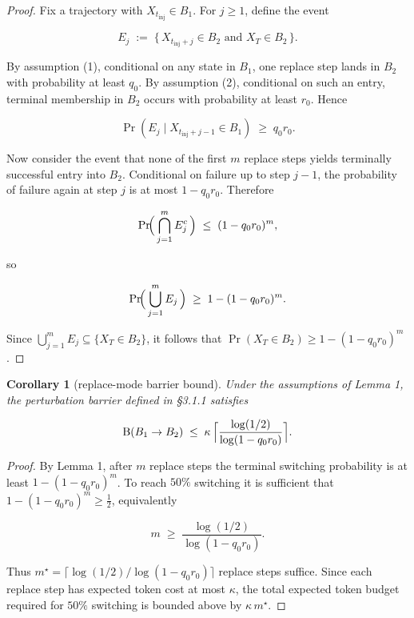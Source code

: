 \documentclass{article}
\theoremstyle{plain}
\newtheorem{corollary}{Corollary}
\theoremstyle{definition}
\begin{document}
\begin{proof}
 Fix a trajectory with $X_{t_{\mathrm{inj}}} \in B_1$. For
$j \ge 1$, define the event

\begin{equation*}
E_j \;:=\; \{\,X_{t_{\mathrm{inj}}+j} \in B_2 \text{ and } X_T \in B_2\,\}.
\end{equation*}

By assumption (1), conditional on any state in $B_1$, one replace
step lands in $B_2$ with probability at least $q_0$. By assumption
(2), conditional on such an entry, terminal membership in $B_2$ occurs
with probability at least $r_0$. Hence

\begin{equation*}
\Pr(E_j \mid X_{t_{\mathrm{inj}}+j-1} \in B_1) \;\ge\; q_0 r_0.
\end{equation*}

Now consider the event that none of the first $m$ replace steps
yields terminally successful entry into $B_2$. Conditional on failure
up to step $j-1$, the probability of failure again at step $j$ is at
most $1 - q_0 r_0$. Therefore

\begin{equation*}
\Pr\!\Bigl(\,\bigcap_{j=1}^{m} E_j^c\,\Bigr) \;\le\; (1 - q_0 r_0)^m,
\end{equation*}

so

\begin{equation*}
\Pr\!\Bigl(\,\bigcup_{j=1}^{m} E_j\,\Bigr) \;\ge\; 1 - (1 - q_0 r_0)^m.
\end{equation*}

Since $\bigcup_{j=1}^{m} E_j \subseteq \{X_T \in B_2\}$, it follows
that $\Pr(X_T \in B_2) \ge 1 - (1 - q_0 r_0)^m$.
\end{proof}


\begin{corollary}[replace-mode barrier bound]
 Under the assumptions
of Lemma 1, the perturbation barrier defined in §3.1.1 satisfies

\begin{equation*}
\mathrm{B}(B_1 \to B_2)
\;\le\;
\kappa \,\Bigl\lceil \frac{\log(1/2)}{\log(1 - q_0 r_0)} \Bigr\rceil .
\end{equation*}
\end{corollary}

\begin{proof}
 By Lemma 1, after $m$ replace steps the terminal switching
probability is at least $1 - (1 - q_0 r_0)^m$. To reach $50\%$
switching it is sufficient that $1 - (1 - q_0 r_0)^m \ge \tfrac{1}{2}$,
equivalently

\begin{equation*}
m \;\ge\; \frac{\log(1/2)}{\log(1 - q_0 r_0)} .
\end{equation*}

Thus $m^\star = \lceil \log(1/2) / \log(1 - q_0 r_0) \rceil$ replace
steps suffice. Since each replace step has expected token cost at most
$\kappa$, the total expected token budget required for $50\%$
switching is bounded above by $\kappa \, m^\star$.
\end{proof}
\end{document}
